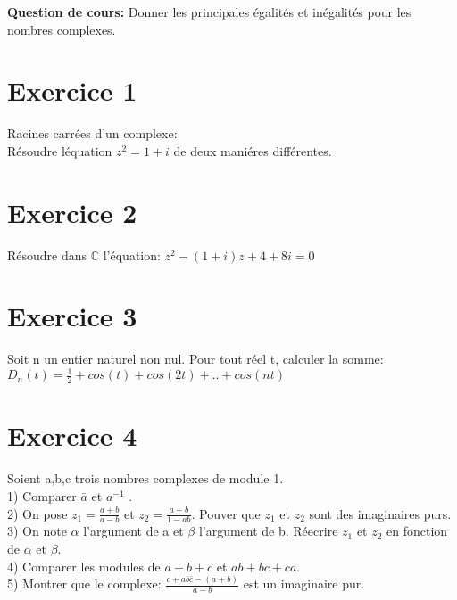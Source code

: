 \documentclass{article}
\begin{document}
\maketitle


\textbf{Question de cours:}
Donner les principales \'egalit\'es et in\'egalit\'es pour les nombres complexes.

\section{Exercice 1}
Racines carr\'ees d'un complexe:
\\ R\'esoudre l\'equation $z^2=1+i$ de deux mani\'eres diff\'erentes.



\section{Exercice 2}
R\'esoudre dans $\mathbb{C}$ l'\'equation: $z^2-(1+i)z+4+8i=0$


\section{Exercice 3}
Soit n un entier naturel non nul. Pour tout r\'eel t, calculer la somme:
\\ $ D_n(t)=\frac{1}{2} +cos(t)+cos(2t)+..+cos(nt)$


\section{Exercice 4}
Soient a,b,c trois nombres complexes de module 1.
\\1) Comparer $\bar{a}$ et $a^{-1}$ .
\\2) On pose $z_1=\frac{a+b}{a-b}$ et $z_2=\frac{a+b}{1-ab}$. Pouver que $z_1$ et $z_2$ sont des imaginaires purs.
\\3) On note $\alpha$ l'argument de a et $\beta$ l'argument de b. R\'eecrire $z_1$ et $z_2$ en fonction de $\alpha$ et $\beta$.
\\4) Comparer les modules de $ a+b+c$ et $ ab+bc+ca$.
\\5) Montrer que le complexe: $\frac{c+ab\bar{c}-(a+b)}{a-b}$ est un imaginaire pur.


\end{document}
